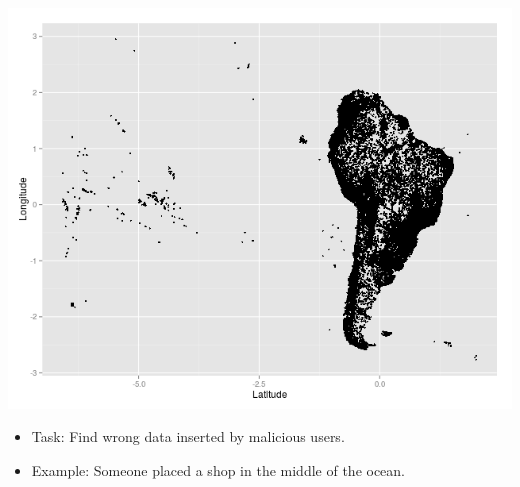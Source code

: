\documentclass{beamer}
\begin{document}
\begin{frame}
    \begin{center}
    \includegraphics[width=.7\textwidth]{images/south_america.png} 
    \end{center}
    \begin{itemize}
        \item Task: Find wrong data inserted by malicious users.

        \item Example: Someone placed a shop in the middle of the ocean.

    \end{itemize}
\end{frame}
\end{document}
